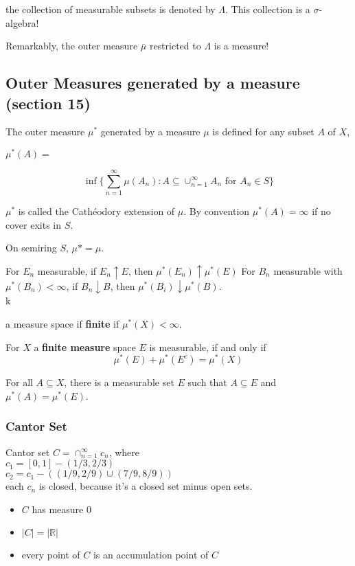 \documentclass[a4paper, 12pt]{article}
\def\R{\ensuremath{\mathbb{R}}} %
\newcommand{\bt}[1]{\textbf{#1}} %
\begin{document}
\begin{multicols}{2}
the collection of measurable subsets is denoted by $\Lambda$.
This collection is a $\sigma$-algebra! 

Remarkably, the outer measure $\bar \mu$ restricted to $\Lambda$ is a measure!


\subsection{Outer Measures generated by a measure (section 15)}
The outer measure $\mu^*$ generated by a measure $\mu$ is defined for any subset $A$ of $X$, 
\centerline{$\mu^*(A) =$}
$$\inf\{\sum_{n=1}^\infty \mu(A_n) : A \subseteq \cup_{n=1}^\infty A_n 
\text{ for $A_n \in S$}\}$$

$\mu^*$ is called the Cath\'eodory extension of $\mu$.
By convention $\mu^*(A) = \infty$ if no cover exits in $S$.

On semiring $S$, $\mu* = \mu$.


For $E_n$ measurable, if $E_n \uparrow E$, then $\mu^*(E_n) \uparrow \mu^*(E)$
For $B_n$ measurable with $\mu^*(B_n) < \infty$, if $B_n \downarrow B$, then
$\mu^*(B_i) \downarrow \mu^*(B)$. \\k

a measure space if \bt{finite} if $\mu^*(X) < \infty$.

For $X$ a \bt{finite measure} space $E$ is measurable, if and only if 
$$\mu^*(E) + \mu^*(E^c) = \mu^*(X)$$

For all $A \subseteq X$, there is a measurable set $E$ such that 
$A \subseteq E$ and $\mu^*(A) = \mu^*(E)$.


\subsubsection{Cantor Set}
Cantor set $C = \cap_{n=1}^\infty c_n$, where \\
$c_1 = [0, 1] - (1/3, 2/3) $\\
$c_2 = c_1 - ((1/9, 2/9) \cup (7/9, 8/9))$ \\

each $c_n$ is closed, because it's a closed set minus open sets.

\begin{itemize}
    \item $C$ has measure 0
    \item $|C| = |\R|$
    \item every point of $C$ is an accumulation point of $C$
\end{itemize}


\end{multicols}
\end{document}
